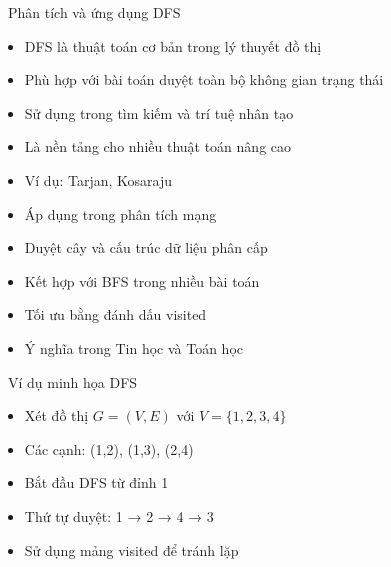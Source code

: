 \documentclass{beamer}
\begin{document}
\begin{frame}{\faBrain\ Phân tích và ứng dụng DFS}
\begin{tcolorbox}
\begin{itemize}
\item DFS là thuật toán cơ bản trong lý thuyết đồ thị
\item Phù hợp với bài toán duyệt toàn bộ không gian trạng thái
\item Sử dụng trong tìm kiếm và trí tuệ nhân tạo
\item Là nền tảng cho nhiều thuật toán nâng cao
\item Ví dụ: Tarjan, Kosaraju
\item Áp dụng trong phân tích mạng
\item Duyệt cây và cấu trúc dữ liệu phân cấp
\item Kết hợp với BFS trong nhiều bài toán
\item Tối ưu bằng đánh dấu visited
\item Ý nghĩa trong Tin học và Toán học
\end{itemize}
\end{tcolorbox}
\end{frame}

\begin{frame}{\faLightbulb\ Ví dụ minh họa DFS}
\begin{tcolorbox}
\begin{itemize}
\item Xét đồ thị $G = (V,E)$ với $V = \{1,2,3,4\}$
\item Các cạnh: (1,2), (1,3), (2,4)
\item Bắt đầu DFS từ đỉnh 1
\item Thứ tự duyệt: 1 → 2 → 4 → 3
\item Sử dụng mảng visited để tránh lặp
\end{itemize}
\end{tcolorbox}

\vspace{0.3cm}

\begin{center}
\end{center}

\end{frame}
\end{document}
